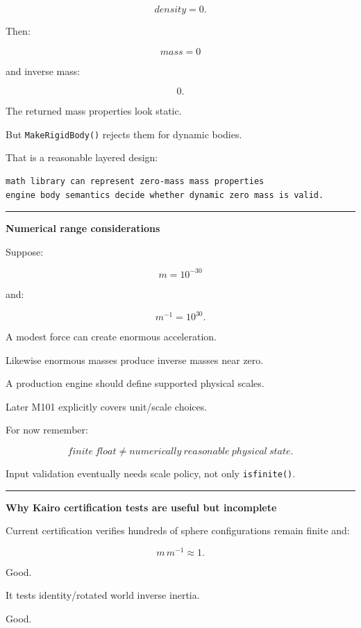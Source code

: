 \[
density=0.
\]

Then:

\[
mass=0
\]

and inverse mass:

\[
0.
\]

The returned mass properties look static.

But \texttt{MakeRigidBody()} rejects them for dynamic bodies.

That is a reasonable layered design:

\begin{verbatim}
math library can represent zero-mass mass properties
engine body semantics decide whether dynamic zero mass is valid.
\end{verbatim}

\begin{center}\rule{0.5\linewidth}{0.5pt}\end{center}

\textbf{Numerical range considerations}

Suppose:

\[
m=10^{-30}
\]

and:

\[
m^{-1}=10^{30}.
\]

A modest force can create enormous acceleration.

Likewise enormous masses produce inverse masses near zero.

A production engine should define supported physical scales.

Later M101 explicitly covers unit/scale choices.

For now remember:

\[
\boxed{
finite\ float
\neq
numerically\ reasonable\ physical\ state.
}
\]

Input validation eventually needs scale policy, not only \texttt{isfinite()}.

\begin{center}\rule{0.5\linewidth}{0.5pt}\end{center}

\textbf{Why Kairo certification tests are useful but incomplete}

Current certification verifies hundreds of sphere configurations remain finite and:

\[
m\,m^{-1}\approx1.
\]

Good.

It tests identity/rotated world inverse inertia.

Good.

